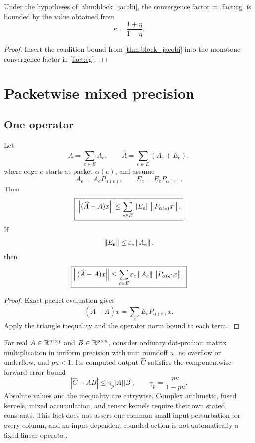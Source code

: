 \begin{corollary}\label{main:corollary:011}\label{cor:certified_pcg}
Under the hypotheses of \cref{thm:block_jacobi}, the convergence factor in \cref{fact:cg} is bounded by the value obtained from
\[
\kappa
=
\frac{1+\eta}{1-\eta}.
\]
\end{corollary}

\begin{proof}\label{main:proof:036}
Insert the condition bound from \cref{thm:block_jacobi} into the monotone convergence factor in \cref{fact:cg}.
\label{main:proof:036:end}\end{proof}

\section{Packetwise mixed precision}\label{main:section:008}\label{sec:precision}

\subsection{One operator}\label{main:subsection:008}

\begin{theorem}\label{main:theorem:019}\label{thm:packet_error}
Let
\[
A=
\sum_{e\in E}A_e,
\qquad
\widehat A
=
\sum_{e\in E}(A_e+E_e),
\]
where edge \(e\) starts at packet \(\alpha(e)\), and assume
\[
A_e=A_eP_{\alpha(e)},
\qquad
E_e=E_eP_{\alpha(e)}.
\]
Then
\[
\boxed{
\left\lVert(\widehat A-A)x\right\rVert
\leq
\sum_{e\in E}
\left\lVert E_e\right\rVert
\left\lVert P_{\alpha(e)}x\right\rVert.
}
\]
If
\[
\left\lVert E_e\right\rVert
\leq
\varepsilon_e\left\lVert A_e\right\rVert,
\]
then
\[
\boxed{
\left\lVert(\widehat A-A)x\right\rVert
\leq
\sum_{e\in E}
\varepsilon_e\left\lVert A_e\right\rVert
\left\lVert P_{\alpha(e)}x\right\rVert.
}
\]
\end{theorem}

\begin{proof}\label{main:proof:037}
Exact packet evaluation gives
\[
(\widehat A-A)x
=
\sum_eE_eP_{\alpha(e)}x.
\]
Apply the triangle inequality and the operator norm bound to each term.
\label{main:proof:037:end}\end{proof}

\begin{standardfact}\label{main:standardfact:003}\label{fact:rounding}
For real $A\in\RR^{m\times p}$ and $B\in\RR^{p\times n}$, consider ordinary dot-product matrix multiplication in uniform precision with unit roundoff $u$, no overflow or underflow, and $pu<1$. Its computed output $\widehat C$ satisfies the componentwise forward-error bound
\[
|\widehat C-AB|\le\gamma_p|A||B|,
\qquad\gamma_p=\frac{pu}{1-pu}.
\]
Absolute values and the inequality are entrywise. Complex arithmetic, fused kernels, mixed accumulation, and tensor kernels require their own stated constants. This fact does not assert one common small input perturbation for every column, and an input-dependent rounded action is not automatically a fixed linear operator.
\end{standardfact}

